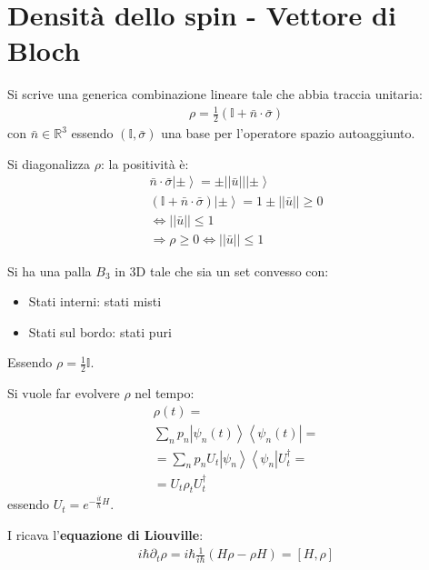 \section{Densità dello spin - Vettore di Bloch} %
Si scrive una generica combinazione lineare tale che abbia traccia unitaria:
\begin{equation}\begin{split}
\rho=\frac{1}{2}\left(\mathbb{I}+\bar n\cdot \bar \sigma\right)
\end{split}\end{equation}
con $\bar n\in \mathbb{R} ^3$ essendo $\left(\mathbb{I},\bar \sigma\right)$ una base per l'operatore spazio autoaggiunto.

Si diagonalizza $\rho$: la positività è:
\begin{equation}\begin{split}
\bar n\cdot \bar \sigma\left |\pm \right\rangle=\pm ||\bar u||\left |\pm \right\rangle \\
\left(\mathbb{I}+\bar n\cdot \bar \sigma\right)\left |\pm \right\rangle=1\pm ||\bar u||\ge 0 \\
\Longleftrightarrow ||\bar u||\le 1 \\
\Longrightarrow \rho\ge 0 \Longleftrightarrow ||\bar u||\le 1
\end{split}\end{equation}

Si ha una palla $B_3$ in 3D tale che sia un set convesso con:
\begin{itemize}
\item Stati interni: stati misti
\item Stati sul bordo: stati puri
\end{itemize}
Essendo $\rho=\frac{1}{2}\mathbb{I}$.

Si vuole far evolvere $\rho$ nel tempo:
\begin{equation}\begin{split}
\rho\left(t\right)=\\
\sum_n{p_n\left |\psi _n\left(t\right) \right\rangle\left\langle \psi _n\left(t\right)\right |}=\\
=\sum_n{p_nU_t\left |\psi _n \right\rangle\left\langle \psi _n\right |U_t^{\dag}}=\\
=U_t\rho_tU_t^{\dag}
\end{split}\end{equation}
essendo $U_t=e^{-\frac{it}{\hbar }H}$.

I ricava l'\textbf{equazione di Liouville}:
\begin{equation}\begin{split}
i\hbar \partial _t\rho=i\hbar \frac{1}{i\hbar }\left(H\rho -\rho H\right)=\left[H,\rho\right]
\end{split}\end{equation}


